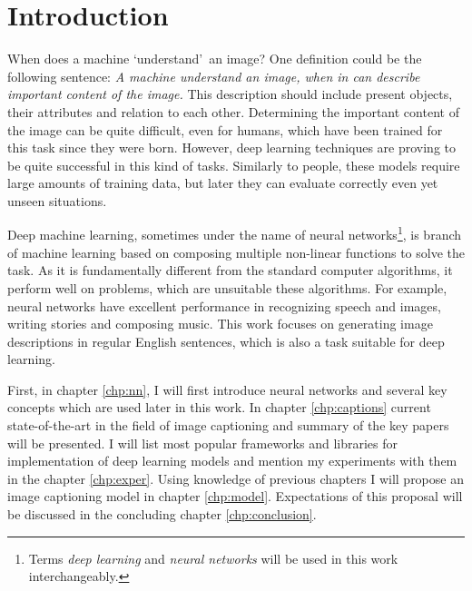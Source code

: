 
\chapter{Introduction}

When does a machine \textquoteleft understand\textquoteright\ an image? One definition could be the following sentence: \emph{A machine understand an image, when in can describe important content of the image.} This description should include present objects, their attributes and relation to each other. Determining the important content of the image can be quite difficult, even for humans, which have been trained for this task since they were born. However, deep learning techniques are proving to be quite successful in this kind of tasks. Similarly to people, these models require large amounts of training data, but later they can evaluate correctly even yet unseen situations.

Deep machine learning, sometimes under the name of neural networks\footnote{Terms \emph{deep learning} and \emph{neural networks} will be used in this work interchangeably.}, is branch of machine learning based on composing multiple non-linear functions to solve the task. As it is fundamentally different from the standard computer algorithms, it perform well on problems, which are unsuitable these algorithms. For example, neural networks have excellent performance in recognizing speech and images, writing stories and composing music. This work focuses on generating image descriptions in regular English sentences, which is also a task suitable for deep learning.

First, in chapter \ref{chp:nn}, I will first introduce neural networks and several key concepts which are used later in this work. In chapter \ref{chp:captions} current state-of-the-art in the field of image captioning and summary of the key papers will be presented. I will list most popular frameworks and libraries for implementation of deep learning models and mention my experiments with them in the chapter \ref{chp:exper}. Using knowledge of previous chapters I will propose an image captioning model in chapter \ref{chp:model}. Expectations of this proposal will be discussed in the concluding chapter \ref{chp:conclusion}.


